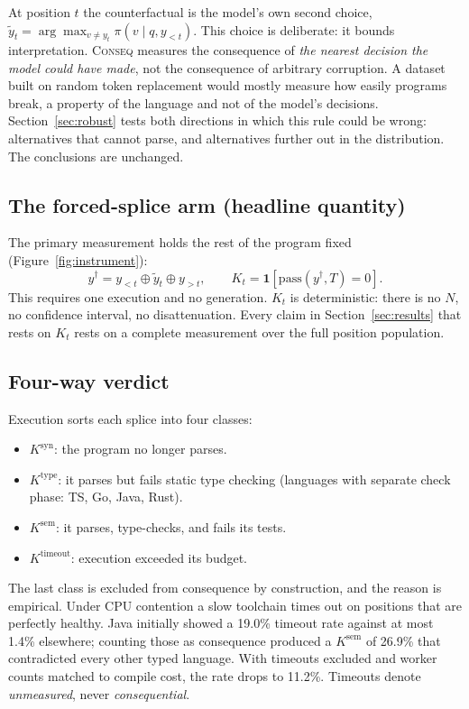 \documentclass[twoside,11pt]{article}
\begin{document}
At position $t$ the counterfactual is the model's own second choice,
$\tilde{y}_t = \arg\max_{v \neq y_t} \pi(v \mid q, y_{<t})$. This choice is deliberate: it
bounds interpretation. \textsc{Conseq} measures the consequence of \emph{the nearest decision the
model could have made}, not the consequence of arbitrary corruption. A dataset built on random
token replacement would mostly measure how easily programs break, a property of the
language and not of the model's decisions. Section~\ref{sec:robust} tests both directions in
which this rule could be wrong: alternatives that cannot parse, and alternatives further out in
the distribution. The conclusions are unchanged.

\subsection{The forced-splice arm (headline quantity)}

The primary measurement holds the rest of the program fixed (Figure~\ref{fig:instrument}):
\[
y^{\dagger} = y_{<t} \oplus \tilde{y}_t \oplus y_{>t}, \qquad
K_t = \mathbf{1}[\mathrm{pass}(y^{\dagger}, T) = 0].
\]
This requires one execution and no generation. $K_t$ is deterministic: there is no $N$, no
confidence interval, no disattenuation. Every claim in Section~\ref{sec:results} that rests on
$K_t$ rests on a complete measurement over the full position population.

\subsection{Four-way verdict}

Execution sorts each splice into four classes:
\begin{itemize}
\item $K^{\mathrm{syn}}$: the program no longer parses.
\item $K^{\mathrm{type}}$: it parses but fails static type checking (languages with separate check phase: TS, Go, Java, Rust).
\item $K^{\mathrm{sem}}$: it parses, type-checks, and fails its tests.
\item $K^{\mathrm{timeout}}$: execution exceeded its budget.
\end{itemize}

The last class is excluded from consequence by construction, and the reason is empirical. Under CPU
contention a slow toolchain times out on positions that are perfectly healthy. Java initially
showed a 19.0\% timeout rate against at most 1.4\% elsewhere; counting those as consequence
produced a $K^{\mathrm{sem}}$ of 26.9\% that contradicted every other typed language. With timeouts
excluded and worker counts matched to compile cost, the rate drops to 11.2\%. Timeouts denote \emph{unmeasured},
never \emph{consequential}.
\end{document}
